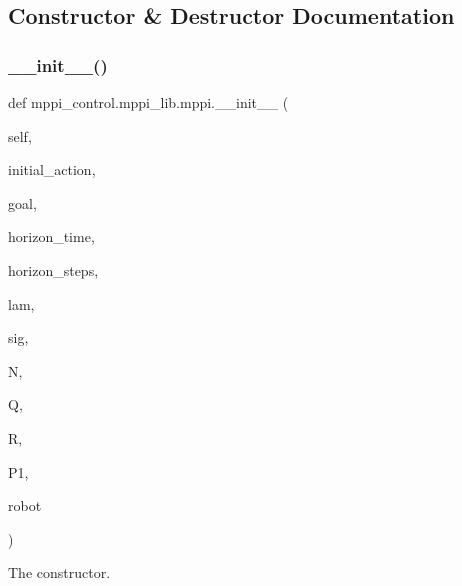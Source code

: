 \subsection{Constructor \& Destructor Documentation}
\mbox{\label{classmppi__control_1_1mppi__lib_1_1mppi_a76565f0e7592710c414d86b6c010460f}} 
\subsubsection{\texorpdfstring{\+\_\+\+\_\+init\+\_\+\+\_\+()}{\_\_init\_\_()}}
{\footnotesize\ttfamily def mppi\+\_\+control.\+mppi\+\_\+lib.\+mppi.\+\_\+\+\_\+init\+\_\+\+\_\+ (\begin{DoxyParamCaption}\item[{}]{self,  }\item[{}]{initial\+\_\+action,  }\item[{}]{goal,  }\item[{}]{horizon\+\_\+time,  }\item[{}]{horizon\+\_\+steps,  }\item[{}]{lam,  }\item[{}]{sig,  }\item[{}]{N,  }\item[{}]{Q,  }\item[{}]{R,  }\item[{}]{P1,  }\item[{}]{robot }\end{DoxyParamCaption})}



The constructor. 


